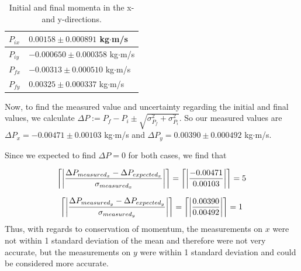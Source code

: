 \documentclass[11pt]{article}
\DeclarePairedDelimiter{\ceil}{\lceil}{\rceil}
\begin{document}
\begin{table}[]
\centering
\caption{Initial and final momenta in the x- and y-directions.}
\label{tabmom}
\begin{tabular}{|l|l|}
\hline
$P_{ix}$ & $0.00158\pm0.000891$ kg$\cdot$m/s   \\ \hline
$P_{iy}$ & $-0.000650\pm 0.000358$ kg$\cdot$m/s \\ \hline
$P_{fx}$ & $-0.00313\pm 0.000510$ kg$\cdot$m/s \\ \hline
$P_{fy}$ & $0.00325 \pm 0.000337$ kg$\cdot$m/s \\ \hline
\end{tabular}
\end{table}

Now, to find the measured value and uncertainty regarding the initial and final values, we calculate $\Delta P := P_{f}-P_{i} \pm \sqrt{\sigma_{P_{f}}^2+\sigma_{P_{i}}^2}$. So our measured values are $\Delta P_x = -0.00471 \pm 0.00103$ kg$\cdot$m/s and $\Delta P_y = 0.00390 \pm 0.000492$ kg$\cdot$m/s.

Since we expected to find $\Delta P = 0$ for both cases, we find that

\begin{align}
\ceil*{\left\vert\frac{\Delta P_{measured_x}-\Delta P_{expected_x}}{\sigma_{measured_x}}\right\vert} = \ceil*{\left\vert\frac{-0.00471}{0.00103}\right\vert} = 5
\label{errPx}
\end{align}

\begin{align}
\ceil*{\left\vert\frac{\Delta P_{measured_y}-\Delta P_{expected_y}}{\sigma_{measured_y}}\right\vert} = \ceil*{\left\vert\frac{0.00390}{0.00492}\right\vert} = 1
\label{errPy}
\end{align}
Thus, with regards to conservation of momentum, the measurements on $x$ were not within 1 standard deviation of the mean and therefore were not very accurate, but the measurements on $y$ were within 1 standard deviation and could be considered more accurate.
\end{document}
